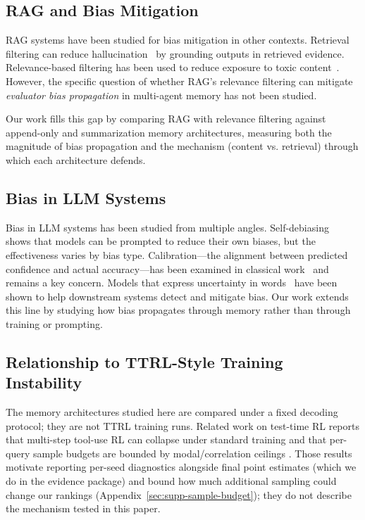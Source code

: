 \documentclass[11pt]{article}
\begin{document}
\subsection{RAG and Bias Mitigation}

RAG systems have been studied for bias mitigation in other contexts. Retrieval filtering can reduce hallucination~\cite{gao2024retrieval} by grounding outputs in retrieved evidence. Relevance-based filtering has been used to reduce exposure to toxic content~\cite{gehman2020realtoxicityprompts}. However, the specific question of whether RAG's relevance filtering can mitigate \emph{evaluator bias propagation} in multi-agent memory has not been studied.

Our work fills this gap by comparing RAG with relevance filtering against append-only and summarization memory architectures, measuring both the magnitude of bias propagation and the mechanism (content vs. retrieval) through which each architecture defends.

\subsection{Bias in LLM Systems}

Bias in LLM systems has been studied from multiple angles. Self-debiasing~\cite{schick2021debiasing} shows that models can be prompted to reduce their own biases, but the effectiveness varies by bias type. Calibration---the alignment between predicted confidence and actual accuracy---has been examined in classical work~\cite{guo2017calibration,kadavath2022language} and remains a key concern. Models that express uncertainty in words~\cite{lin2022teach} have been shown to help downstream systems detect and mitigate bias. Our work extends this line by studying how bias propagates through memory rather than through training or prompting.

\subsection{Relationship to TTRL-Style Training Instability}
The memory architectures studied here are compared under a fixed decoding protocol; they are not TTRL training runs. Related work on test-time RL reports that multi-step tool-use RL can collapse under standard training \citep{hao2026tooluse,liang2026mirage} and that per-query sample budgets are bounded by modal/correlation ceilings \citep{bay2026sampling}. Those results motivate reporting per-seed diagnostics alongside final point estimates (which we do in the evidence package) and bound how much additional sampling could change our rankings (Appendix~\ref{sec:supp-sample-budget}); they do not describe the mechanism tested in this paper.
\end{document}
